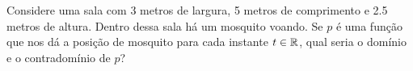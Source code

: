 Considere uma sala com 3 metros de largura, 5 metros de comprimento e 2.5 metros de altura.
Dentro dessa sala há um mosquito voando.
Se $p$ é uma função que nos dá a posição de mosquito para cada instante $t\in\mathbb{R}$, qual
seria o domínio e o contradomínio de $p$?

